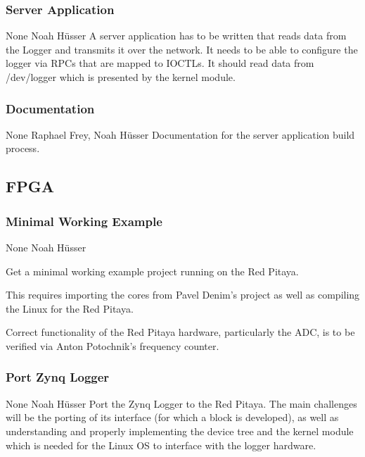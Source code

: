 \documentclass[a4paper,oneside]{alpenspecs/alpenspecs}
\begin{document}
\subsubsection{Server Application}
\label{subsubsec:fw:server:server}
\wpac
     {}
     {}
     {}
     {None}
     {}
     {Noah H\"usser}
     {%
         A server application has to be written that reads data from the Logger and transmits it over the network.
         It needs to be able to configure the logger via RPCs that are mapped to IOCTLs.
         It should read data from /dev/logger which is presented by the kernel module.
     }

\subsubsection{Documentation}
\label{subsubsec:fw:server:docs}
\wpac
     {}
     {}
     {}
     {None}
     {}
     {Raphael Frey, Noah H\"usser}
     {%
         Documentation for the server application build process.
     }

\subsection{FPGA}
\label{subsec:fw:fpga}

\subsubsection{Minimal Working Example}
\label{subsubsec:fw:fpga:mwe}
\wpac
     {}
     {}
     {}
     {None}
     {}
     {Noah H\"usser}
     {%
         Get a minimal working example project running on the Red Pitaya.

         This requires importing the cores from Pavel Denim's project as
         well as compiling the Linux for the Red Pitaya.

         Correct functionality of the Red Pitaya hardware, particularly the
         ADC, is to be verified via Anton Potochnik's frequency counter.
     }

\subsubsection{Port Zynq Logger}
\label{subsubsec:fw:fpga:logger}
\wpac
     {}
     {}
     {}
     {None}
     {}
     {Noah H\"usser}
     {%
         Port the Zynq Logger to the Red Pitaya. The main challenges will be
         the porting of its interface (for which a block 
         is developed), as well as understanding and properly implementing the
         device tree and the kernel module which is needed for the Linux OS
         to interface with the logger hardware.
     }
\end{document}
